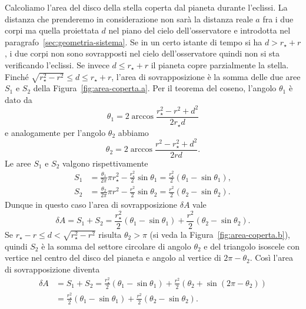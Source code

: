 Calcoliamo l'area del disco della stella coperta dal pianeta durante
l'eclissi. La distanza che prenderemo in considerazione non sarà la distanza
reale $a$ fra i due corpi ma quella proiettata $d$ nel piano del cielo
dell'osservatore e introdotta nel paragrafo~\ref{sec:geometria-sistema}. Se in
un certo istante di tempo si ha $d > r_\star + r$, i due corpi non sono
sovrapposti nel cielo dell'osservatore quindi non si sta verificando
l'eclissi. Se invece $d \leq r_\star + r$ il pianeta copre parzialmente la
stella. Finché $\sqrt{r_\star^2 - r^2} \leq d \leq r_\star + r$, l'area di
sovrapposizione è la somma delle due aree $S_1$ e $S_2$ della
Figura~\ref{fig:area-coperta.a}. Per il teorema del coseno, l'angolo $\theta_1$
è dato da
\begin{equation}
  \theta_1 = 2 \arccos \frac{r_\star^2 - r^2 + d^2}{2r_\star d}
\end{equation}
e analogamente per l'angolo $\theta_2$ abbiamo
\begin{equation}
  \theta_2 = 2 \arccos \frac{r^2 - r_\star^2 + d^2}{2rd}.
\end{equation}
Le aree $S_1$ e $S_2$ valgono rispettivamente
\begin{subequations}
  \begin{align}
    S_1 &= \frac{\theta_1}{2\pi}\pi r_\star^2 - \frac{r_\star^2}{2}\sin\theta_1
    = \frac{r_\star^2}{2}(\theta_1 - \sin\theta_1), \\
    S_2 &= \frac{\theta_2}{2\pi}\pi r^2 - \frac{r^2}{2}\sin\theta_2 =
    \frac{r^2}{2}(\theta_2 - \sin\theta_2).
  \end{align}
\end{subequations}
Dunque in questo caso l'area di sovrapposizione $\delta A$ vale
\begin{equation}
  \delta A = S_1 + S_2 = \frac{r_\star^2}{2}(\theta_1 - \sin\theta_1) +
  \frac{r^2}{2}(\theta_2 - \sin\theta_2).
\end{equation}
Se $r_\star - r \leq d < \sqrt{r_\star^2 - r^2}$ risulta $\theta_2 > \pi$ (si
veda la Figura~\ref{fig:area-coperta.b}), quindi $S_2$ è la somma del settore
circolare di angolo $\theta_2$ e del triangolo isoscele con vertice nel centro
del disco del pianeta e angolo al vertice di $2\pi - \theta_2$. Così l'area di
sovrapposizione diventa
\begin{equation}
  \begin{split}
    \delta A &= S_1 + S_2 = \frac{r_\star^2}{2}(\theta_1 - \sin\theta_1) +
    \frac{r^2}{2}(\theta_2 + \sin(2\pi -\theta_2)) \\
    &= \frac{r_\star^2}{2}(\theta_1 - \sin\theta_1) + \frac{r^2}{2}(\theta_2 -
    \sin\theta_2).
  \end{split}
\end{equation}
